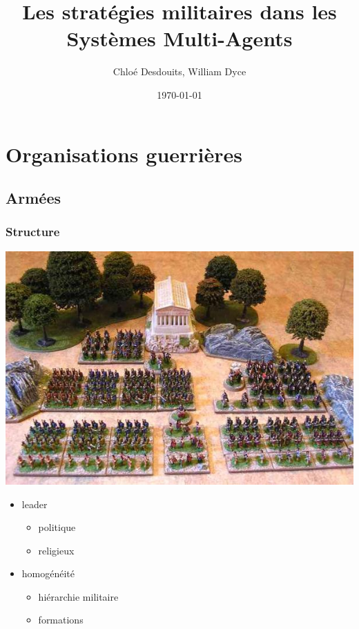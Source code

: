 \documentclass{article}
\title{Les stratégies militaires dans les Systèmes Multi-Agents}
\author{Chloé Desdouits, William Dyce}
\date{\today}
\begin{document}
\maketitle

\tableofcontents
\newpage


\section{Organisations guerrières}

\subsection{Armées}

\subsubsection{Structure}

\begin{centering}
		\includegraphics[width=\linewidth]{../ressources/armee_cesar}
		\end{centering}
\begin{itemize}
			\item leader
			\begin{itemize}
				\item politique
				\item religieux
			\end{itemize}
		\end{itemize}
		\begin{itemize}
			\item homogénéité
			\begin{itemize}
				\item hiérarchie militaire
				\item formations
			\end{itemize}
		\end{itemize}
\end{document}

